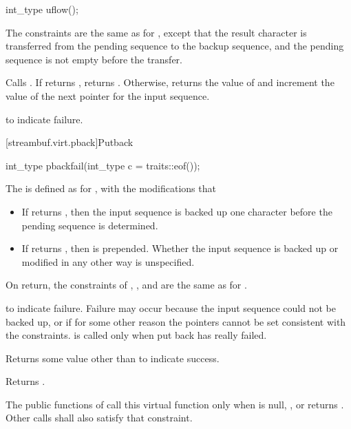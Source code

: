 %
\begin{itemdecl}
int_type uflow();
\end{itemdecl}

\begin{itemdescr}
\pnum
\expects
The constraints are the same as for
,
except that the result character is transferred from the pending
sequence to the backup sequence, and the pending sequence is not empty before the transfer.

\pnum
{}
Calls
.
If
returns
,
returns
.
Otherwise, returns the value of
and increment the value of the next pointer for the input sequence.

\pnum
\returns
{}
to indicate failure.
\end{itemdescr}

[streambuf.virt.pback]{Putback}

%
\begin{itemdecl}
int_type pbackfail(int_type c = traits::eof());
\end{itemdecl}

\begin{itemdescr}
\pnum
The
is defined as for
,
with the modifications that
\begin{itemize}
\item
If
returns
,
then the input sequence is backed up one character before the pending sequence is determined.
\item
If
returns , then  is prepended.
Whether the input sequence is backed up or modified in any other way is unspecified.
\end{itemize}

\pnum
\ensures
On return, the constraints of
,
,
and
are the same as for
.

\pnum
\returns
{}
to indicate failure.
Failure may occur because the input sequence could not be backed up, or if for some
other reason the pointers cannot be set consistent with the constraints.
is called only when put back has really failed.

\pnum
Returns some value other than
to indicate success.

\pnum
{}
Returns
.

\pnum
\remarks
The public functions of
call this virtual function only when
is null,
,
or
returns
.
Other calls shall also satisfy that constraint.
\end{itemdescr}

